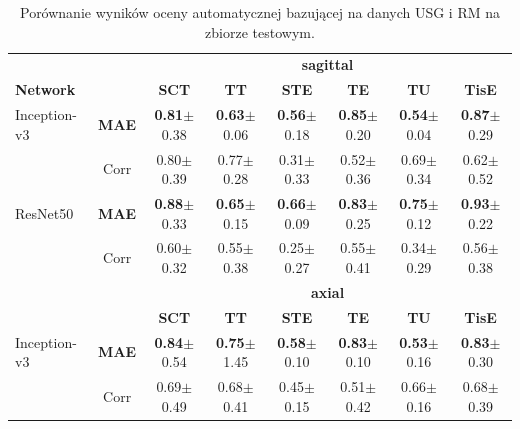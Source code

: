 \begin{table}[h]
	\footnotesize
	\setlength{\tabcolsep}{1pt}
	\centering
	\caption{Porównanie wyników oceny automatycznej bazującej na danych USG i RM na zbiorze testowym.}
	\label{tab:USGvsRM-cross-validation}
	\vspace{-0.5cm}
	\begin{tabular}{lc||c|c|c|c|c|c}
		& & \multicolumn{6}{c}{\normalsize{\textbf{sagittal}}} \\
		\textbf{Network} & & \textbf{SCT} & \textbf{TT} & \textbf{STE} & \textbf{TE} & \textbf{TU} & \textbf{TisE} \\ \hline
		Inception-v3 & \textbf{MAE} & \textbf{0.81}$\pm$0.38 & \textbf{0.63}$\pm$0.06 & \textbf{0.56}$\pm$0.18 & \textbf{0.85}$\pm$0.20 & \textbf{0.54}$\pm$0.04 & \textbf{0.87}$\pm$0.29 \\
		& Corr & 0.80$\pm$0.39 & 0.77$\pm$0.28 & 0.31$\pm$0.33 & 0.52$\pm$0.36 & 0.69$\pm$0.34 & 0.62$\pm$0.52 \\ \hline
		ResNet50 & \textbf{MAE} & \textbf{0.88}$\pm$0.33 & \textbf{0.65}$\pm$0.15 & \textbf{0.66}$\pm$0.09 & \textbf{0.83}$\pm$0.25 & \textbf{0.75}$\pm$0.12 & \textbf{0.93}$\pm$0.22 \\
		& Corr & 0.60$\pm$0.32 & 0.55$\pm$0.38 & 0.25$\pm$0.27 & 0.55$\pm$0.41 & 0.34$\pm$0.29 & 0.56$\pm$0.38 \\
		\hline \hline
		& & \multicolumn{6}{c}{\normalsize{\textbf{axial}}} \\
		& & \textbf{SCT} & \textbf{TT} & \textbf{STE} & \textbf{TE} & \textbf{TU} & \textbf{TisE}\\ \hline
		Inception-v3 & \textbf{MAE} & \textbf{0.84}$\pm$0.54 & \textbf{0.75}$\pm$1.45 & \textbf{0.58}$\pm$0.10 & \textbf{0.83}$\pm$0.10 & \textbf{0.53}$\pm$0.16 & \textbf{0.83}$\pm$0.30 \\
		& Corr & 0.69$\pm$0.49 & 0.68$\pm$0.41 & 0.45$\pm$0.15 & 0.51$\pm$0.42 & 0.66$\pm$0.16 & 0.68$\pm$0.39 \\ \hline

\end{tabular}
\end{table}

